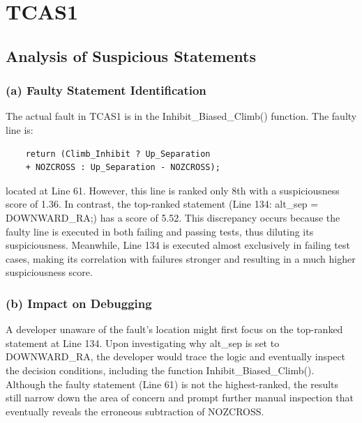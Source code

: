 \documentclass[conference]{IEEEtran}
\begin{document}


\section{TCAS1}

\subsection{Analysis of Suspicious Statements}

\subsubsection*{(a) Faulty Statement Identification}
The actual fault in TCAS1 is in the Inhibit\_Biased\_Climb() function. The faulty line is:

\begin{small}
\begin{verbatim}
    return (Climb_Inhibit ? Up_Separation 
    + NOZCROSS : Up_Separation - NOZCROSS);
\end{verbatim}
\end{small}

located at Line 61. However, this line is ranked only 8th with a suspiciousness score of 1.36. In contrast, the top-ranked statement (Line 134: alt\_sep = DOWNWARD\_RA;) has a score of 5.52. This discrepancy occurs because the faulty line is executed in both failing and passing tests, thus diluting its suspiciousness. Meanwhile, Line 134 is executed almost exclusively in failing test cases, making its correlation with failures stronger and resulting in a much higher suspiciousness score.
\subsubsection*{(b) Impact on Debugging}
A developer unaware of the fault's location might first focus on the top-ranked statement at Line 134. Upon investigating why alt\_sep is set to DOWNWARD\_RA, the developer would trace the logic and eventually inspect the decision conditions, including the function Inhibit\_Biased\_Climb(). Although the faulty statement (Line 61) is not the highest-ranked, the results still narrow down the area of concern and prompt further manual inspection that eventually reveals the erroneous subtraction of NOZCROSS.
\end{document}
